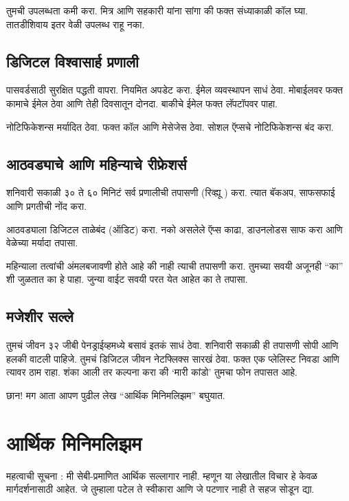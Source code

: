 तुमची उपलब्धता कमी करा. मित्र आणि सहकारी यांना सांगा की फक्त संध्याकाळी कॉल घ्या. तातडीशिवाय इतर वेळी उपलब्ध राहू नका.

\section*{डिजिटल विश्वासार्ह प्रणाली}

पासवर्डसाठी सुरक्षित पद्धती वापरा. नियमित अपडेट करा. ईमेल व्यवस्थापन साधं ठेवा. मोबाईलवर फक्त कामाचे ईमेल ठेवा आणि तेही दिवसातून दोनदा. बाकीचे ईमेल फक्त लॅपटॉपवर पाहा.

नोटिफिकेशन्स मर्यादित ठेवा. फक्त कॉल आणि मेसेजेस ठेवा. सोशल ऍप्सचे नोटिफिकेशन्स बंद करा.

\section*{आठवड्याचे आणि महिन्याचे रीफ्रेशर्स}

शनिवारी सकाळी ३० ते ६० मिनिटं सर्व प्रणालीची तपासणी (रिव्ह्यू ) करा. त्यात बॅकअप, साफसफाई आणि प्रगतीची नोंद करा.

आठवड्याला डिजिटल ताळेबंद (ऑडिट)  करा. नको असलेले ऍप्स काढा, डाउनलोडस साफ करा आणि वेळेच्या मर्यादा तपासा.

महिन्याला तत्वांची अंमलबजावणी होते आहे की नाही त्याची तपासणी करा. तुमच्या सवयी अजूनही “का” शी जुळतात का हे पाहा. जुन्या वाईट सवयी परत येत आहेत का ते तपासा.

\section*{मजेशीर सल्ले}

तुमचं जीवन ३२ जीबी पेनड्राईव्हमध्ये बसावं इतकं साधं ठेवा. शनिवारी सकाळी ही तपासणी सोपी आणि हलकी वाटली पाहिजे. तुमचं डिजिटल जीवन नेटफ्लिक्स सारखं ठेवा. फक्त एक प्लेलिस्ट निवडा आणि त्यावर ठाम राहा.
शंका आली तर कल्पना करा की ‘मारी कांडो’ तुमचा फोन तपासत आहे.

छान! मग आता आपण पुढील लेख “आर्थिक मिनिमलिझम” बघुयात.


\chapter{आर्थिक मिनिमलिझम}

महत्वाची सूचना : मी सेबी-प्रमाणित आर्थिक सल्लागार नाही. म्हणून या लेखातील विचार हे केवळ मार्गदर्शनासाठी आहेत. जे तुम्हाला पटेल ते स्वीकारा आणि जे पटणार नाही ते सहज सोडून द्या.

